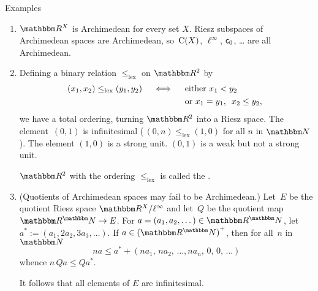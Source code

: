 \documentclass[main.tex]{subfiles}
\begin{document}
\begin{psec}{3.3}{Examples}
\begin{enumerate}
\item \label{3.3-1}
$\R^X$ is Archimedean for every set $X$.
Riesz subspaces of Archimedean spaces are Archimedean,
so~$\mathrm{C}(X)$, $\ell^\infty$, $\mathsf{c}_0$, \ldots{} 
are all Archimedean.
%
\item \label{3.3-2}%
\newcommand{\leqlex}{\leq_{\mathrm{lex}}}
Defining a binary relation $\leqlex$ on $\R^2$ by
\begin{align*}
(x_1,x_2) \leqlex (y_1,y_2)   \quad \iff \quad
& \htam{ either }x_1<y_2 \\
& \htam{ or }x_1 = y_1\htam{, }\ x_2 \leq y_2\htam{, }
\end{align*}
we have a total ordering,
turning $\R^2$ into a Riesz space.
The element~$(0,1)$ is infinitesimal
(\,$(0,n)\leqlex(1,0)$ for all $n$ in $\N$).
The element $(1,0)$ is a strong unit.
$(0,1)$ is a weak but not a strong unit.

$\R^2$ with the ordering $\leqlex$ is called
the .
%
\item \label{3.3-3}%
(Quotients of Archimedean spaces may fail to be Archimedean.)
Let~$E$ be the quotient Riesz space $\R^X / \ell^\infty$
and let~$Q$ be the quotient map $\R^\N\ra E$.
For $a=(a_1, a_2, \dotsc)\in \R^\N$,
let $a^* := (a_1,2a_2,3a_3,\dotsc)$.
If $a\in \smash{{(\R^\N)}^+}$, then for all~$n$ in~$\N$
\begin{equation*}
na \leq a^* + (na_1,\, na_2,\, \dotsc, na_n,\, 0,\, 0,\, \dotsc)
\end{equation*}
whence $n\, Qa\leq Qa^*$.

It follows that all elements of $E$ are infinitesimal.
\end{enumerate}
\end{psec}
\clearpage
\end{document}

